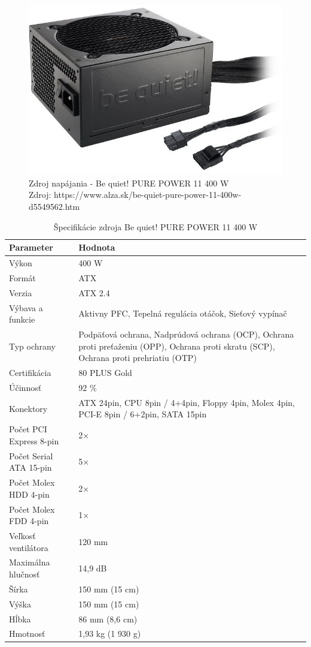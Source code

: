 \documentclass[12pt,oneside,slovak,a4paper]{article}
\begin{document}
\begin{figure}[H]
	\centering
	\captionsetup{justification=centering,margin=2cm}
	\includegraphics[scale=0.5]{./images/power-supply.png} %
	\centering
	\caption{Zdroj napájania - Be quiet! PURE POWER 11 400 W \\ Zdroj: https://www.alza.sk/be-quiet-pure-power-11-400w-d5549562.htm}
\end{figure}

\begin{table}[h]
\centering
\begin{tabularx}{\textwidth}{|l|X|}
\hline
\textbf{Parameter} & \textbf{Hodnota} \\ \hline
Výkon & 400 W \\ \hline
Formát & ATX \\ \hline
Verzia & ATX 2.4 \\ \hline
Výbava a funkcie & Aktivny PFC, Tepelná regulácia otáčok, Sieťový vypínač \\ \hline
Typ ochrany & Podpäťová ochrana, Nadprúdová ochrana (OCP), Ochrana proti preťaženiu (OPP), Ochrana proti skratu (SCP), Ochrana proti prehriatiu (OTP) \\ \hline
Certifikácia & 80 PLUS Gold \\ \hline
Účinnosť & 92 \% \\ \hline
Konektory & ATX 24pin, CPU 8pin / 4+4pin, Floppy 4pin, Molex 4pin, PCI-E 8pin / 6+2pin, SATA 15pin \\ \hline
Počet PCI Express 8-pin & 2× \\ \hline
Počet Serial ATA 15-pin & 5× \\ \hline
Počet Molex HDD 4-pin & 2× \\ \hline
Počet Molex FDD 4-pin & 1× \\ \hline
Veľkosť ventilátora & 120 mm \\ \hline
Maximálna hlučnosť & 14,9 dB \\ \hline
Šírka & 150 mm (15 cm) \\ \hline
Výška & 150 mm (15 cm) \\ \hline
Hĺbka & 86 mm (8,6 cm) \\ \hline
Hmotnosť & 1,93 kg (1 930 g) \\ \hline
\end{tabularx}
\caption{Špecifikácie zdroja Be quiet! PURE POWER 11 400 W}
\end{table}
\end{document}
